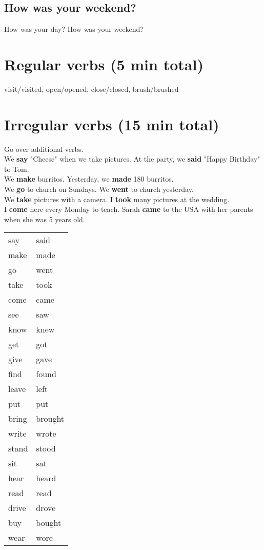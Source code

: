 \documentclass{tufte-handout}
\begin{document}
\subsection{How was your weekend?}
How was your day? How was your weekend?

\section{Regular verbs (5 min total)}
visit/visited, open/opened, close/closed, brush/brushed

\section{Irregular verbs (15 min total)}
Go over additional verbs.\\
We \textbf{say} "Cheese" when we take pictures. At the party, we \textbf{said} "Happy Birthday" to Tom.\\
We \textbf{make} burritos. Yesterday, we \textbf{made} 180 burritos.\\
We \textbf{go} to church on Sundays. We \textbf{went} to church yesterday.\\
We \textbf{take} pictures with a camera. I \textbf{took} many pictures at the wedding.\\
I \textbf{come} here every Monday to teach. Sarah \textbf{came} to the USA with her parents when she was 5 years old.\\

\begin{tabular}{ l l }
say & said\\
make & made\\
go & went\\
take & took\\
come & came\\
see & saw\\
know & knew\\
get & got\\
give & gave\\
find & found\\
leave & left\\
put & put\\
bring & brought\\
write & wrote\\
stand & stood\\
sit & sat\\
hear & heard\\
read & read\\
drive & drove\\
buy & bought\\
wear & wore\\
\end{tabular}
\end{document}

